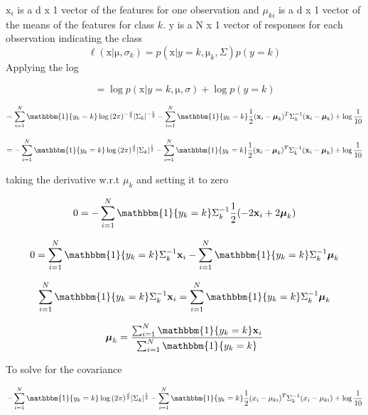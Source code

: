 \documentclass[12pt,letterpaper]{article} %
\newcommand{\bs}[1]{\bm{\mathrm{#1}}} %
\newcommand{\switch}[0]{\mathbbm{1}\{y_k=k\}}
\begin{document}
 $\bs{x}_i$ is a d x 1 vector of the features for one observation and $\mu_{ki}$ is a d x 1 vector of the means of the features for class $k$. y is a N x 1 vector of responses for each observation indicating the class
 \begin{equation*}
  \ell(\bs{x} | \bs{\mu},\sigma_k) = p(\bs{x}|y=k, \bs{\mu}_k,\Sigma)p(y=k)
 \end{equation*}
Applying the log

\begin{equation*}
 = \log{p(\bs{x}|y=k, \bs{\mu},\sigma)} + \log{p(y=k)}
 \end{equation*}

 \begin{equation*} 
  = \sum^N_{i=1}\switch{}\log{(2\pi)^{-\frac{d}{2}}|\Sigma_k|^{-\frac{1}{2}}}-\sum^N_{i=1}\switch{}\frac{1}{2}(\bs{x}_i-\bs{\mu}_{k})^T\Sigma_k^{-1}(\bs{x}_i -\bs{\mu}_{k}) + \log{\frac{1}{10}}
 \end{equation*}
 
  \begin{equation*} 
  = -\sum^N_{i=1}\switch{}\log{(2\pi)^{\frac{d}{2}}|\Sigma_k|^{\frac{1}{2}}}-\sum^N_{i=1}\switch{}\frac{1}{2}(\bs{x}_i-\bs{\mu}_{k})^T\Sigma_k^{-1}(\bs{x}_i -\bs{\mu}_{k}) + \log{\frac{1}{10}}
 \end{equation*}

taking the derivative w.r.t $\mu_{k}$ and setting it to zero

\begin{equation*} 
 0 = -\sum^N_{i=1}\switch\Sigma_k^{-1}\frac{1}{2}(-2\bs{x}_i + 2\bs{\mu}_{k})
\end{equation*}

\begin{equation*} 
 0 = \sum^N_{i=1}\switch\Sigma_k^{-1}\bs{x}_i - \sum^N_{i=1}\switch\Sigma_k^{-1} \bs{\mu}_{k}
\end{equation*}

\begin{equation*} 
 \sum^N_{i=1}\switch\Sigma_k^{-1}\bs{x}_i = \sum^N_{i=1}\switch\Sigma_k^{-1} \bs{\mu}_{k}
\end{equation*}

\begin{equation*} 
 \bs{\mu}_{k} =\frac{\sum^N_{i=1}\switch{}\bs{x}_i}{\sum^N_{i=1}\switch}
\end{equation*}

To solve for the covariance

\begin{equation*} 
 -\sum^N_{i=1}\switch{}\log{(2\pi)^{\frac{d}{2}}|\Sigma_k|^{\frac{1}{2}}}-\sum^N_{i=1}\switch{}\frac{1}{2}(x_i-\mu_{ki})^T\Sigma_k^{-1}(x_i -\mu_{ki}) + \log{\frac{1}{10}}
 \end{equation*}
 
\end{document}
